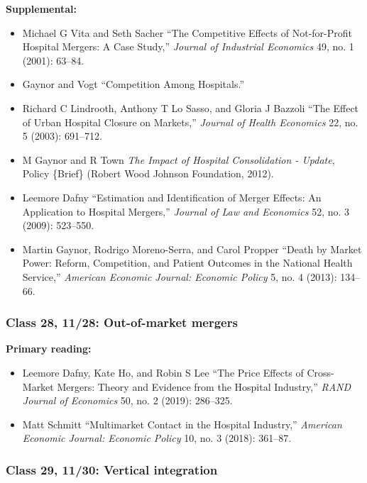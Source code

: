 \documentclass[11pt,]{article}
\providecommand{\tightlist}{%
  \setlength{\itemsep}{0pt}\setlength{\parskip}{0pt}}
\begin{document}
\textbf{Supplemental:}

\begin{itemize}
\tightlist
\item
  Michael G Vita and Seth Sacher {``The Competitive Effects of
  Not-for-Profit Hospital Mergers: A Case Study,''} \emph{Journal of
  Industrial Economics} 49, no. 1 (2001): 63--84.
\item
  Gaynor and Vogt {``Competition Among {Hospitals}.''}
\item
  Richard C Lindrooth, Anthony T Lo Sasso, and Gloria J Bazzoli {``The
  Effect of Urban Hospital Closure on Markets,''} \emph{Journal of
  Health Economics} 22, no. 5 (2003): 691--712.
\item
  M Gaynor and R Town \emph{The Impact of Hospital Consolidation -
  {Update}}, Policy \{Brief\} (Robert Wood Johnson Foundation, 2012).
\item
  Leemore Dafny {``Estimation and {Identification} of {Merger}
  {Effects}: {An} {Application} to {Hospital} {Mergers},''}
  \emph{Journal of Law and Economics} 52, no. 3 (2009): 523--550.
\item
  Martin Gaynor, Rodrigo Moreno-Serra, and Carol Propper {``Death by
  Market Power: Reform, Competition, and Patient Outcomes in the
  {National} {Health} {Service},''} \emph{American Economic Journal:
  Economic Policy} 5, no. 4 (2013): 134--66.
\end{itemize}

\hypertarget{class-28-1128-out-of-market-mergers}{%
\subsubsection{Class 28, 11/28: Out-of-market
mergers}\label{class-28-1128-out-of-market-mergers}}

\textbf{Primary reading:}

\begin{itemize}
\tightlist
\item
  Leemore Dafny, Kate Ho, and Robin S Lee {``The Price Effects of
  Cross-Market Mergers: Theory and Evidence from the Hospital
  Industry,''} \emph{RAND Journal of Economics} 50, no. 2 (2019):
  286--325.
\item
  Matt Schmitt {``Multimarket {Contact} in the {Hospital} {Industry},''}
  \emph{American Economic Journal: Economic Policy} 10, no. 3 (2018):
  361--87.
\end{itemize}

\hypertarget{class-29-1130-vertical-integration}{%
\subsubsection{Class 29, 11/30: Vertical
integration}\label{class-29-1130-vertical-integration}}
\end{document}
